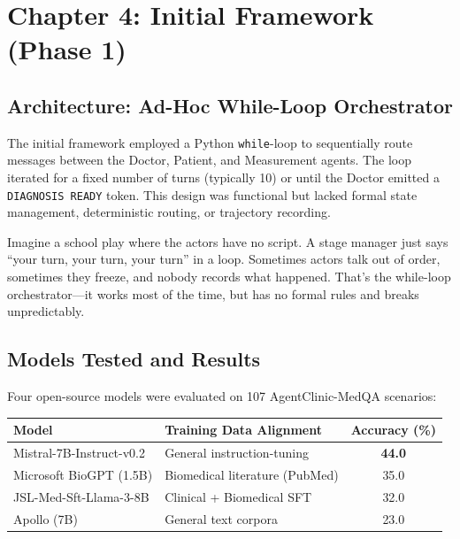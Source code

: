 \section{Chapter 4: Initial Framework (Phase 1)}
\label{ch:initial}

\subsection{Architecture: Ad-Hoc While-Loop Orchestrator}

\begin{acadbox}[\textcolor{white}{Academic Definition}]
The initial framework employed a Python \texttt{while}-loop to sequentially route messages between the Doctor, Patient, and Measurement agents. The loop iterated for a fixed number of turns (typically 10) or until the Doctor emitted a \texttt{DIAGNOSIS READY} token. This design was functional but lacked formal state management, deterministic routing, or trajectory recording.
\end{acadbox}

\begin{analogybox}[\textcolor{white}{Simple Analogy}]
Imagine a school play where the actors have no script. A stage manager just says ``your turn, your turn, your turn'' in a loop. Sometimes actors talk out of order, sometimes they freeze, and nobody records what happened. That's the while-loop orchestrator---it works most of the time, but has no formal rules and breaks unpredictably.
\end{analogybox}

\subsection{Models Tested and Results}

Four open-source models were evaluated on 107 AgentClinic-MedQA scenarios:

\begin{center}
\begin{tabular}{@{}llc@{}}
\toprule
\textbf{Model} & \textbf{Training Data Alignment} & \textbf{Accuracy (\%)} \\
\midrule
Mistral-7B-Instruct-v0.2 & General instruction-tuning & \textbf{44.0} \\
Microsoft BioGPT (1.5B)  & Biomedical literature (PubMed) & 35.0 \\
JSL-Med-Sft-Llama-3-8B   & Clinical + Biomedical SFT & 32.0 \\
Apollo (7B)               & General text corpora & 23.0 \\
\bottomrule
\end{tabular}
\end{center}

